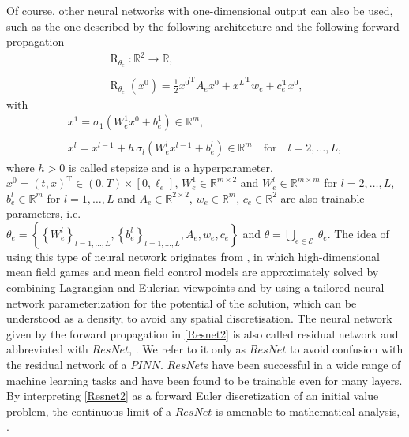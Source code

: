 Of course, other neural networks with one-dimensional output can also be used, such as the one described by the following architecture and the following forward propagation 
\begin{equation} 
    \label{Resnet1}
    \begin{gathered}
        \operatorname{R}_{\theta_e} \colon \mathbb{R}^2 \to \mathbb{R}, \\
        \\
        \operatorname{R}_{\theta_e}\left(x^0\right) = \frac{1}{2} {x^0}^{\mathrm{T}} A_e x^0 + {x^{L}}^{\mathrm{T}} w_e + c^{\mathrm{T}}_e x^0,
    \end{gathered} 
\end{equation} 
with
\begin{equation}
    \label{Resnet2} 
    \begin{gathered}
        x^1 = \sigma_1\left(W^1_e x^{0} + b^1_e\right) \in \mathbb{R}^m, \\
        \\
        x^l = x^{l-1} + h \, \sigma_l\left(W^l_e x^{l-1} + b^l_e\right) \in \mathbb{R}^m \quad \text{for} \quad l = 2, \ldots, L, 
    \end{gathered} 
\end{equation} 
where $h > 0$ is called stepsize and is a hyperparameter, $x^0 = \left(t, x\right)^{\mathrm{T}} \in \left(0, T\right) \times \left[0, \ell_e\right]$, $W^1_e \in \mathbb{R}^{m \times 2}$ and $W^l_e \in \mathbb{R}^{m \times m}$ for $l = 2, \ldots, L$, $b^l_e \in \mathbb{R}^{m}$ for $l = 1, \ldots, L$ and $A_e \in \mathbb{R}^{2 \times 2}$, $w_e \in \mathbb{R}^m$, $c_e \in \mathbb{R}^2$ are also trainable parameters, i.e. \\
$\theta_e = \left\{ \left\{ W^l_e \right\}_{l = 1, \ldots, L}, \left\{ b^l_e \right\}_{l = 1, \ldots, L}, A_e, w_e, c_e \right\}$ and $\theta = \bigcup_{e \in \mathcal{E}} \ \theta_e$. The idea of using this type of neural network originates from \cite{RuthottoOsherLiNurbekyanFung2020}, in which high-dimensional mean field games and mean field control models are approximately solved by combining Lagrangian and Eulerian viewpoints and by using a tailored neural network parameterization for the potential of the solution, which can be understood as a density, to avoid any spatial discretisation. The neural network given by the forward propagation in \cref{Resnet2} is also called residual network and abbreviated with $ResNet$, \cite{HeZhangRenSun:2015}. We refer to it only as $ResNet$ to avoid confusion with the residual network of a $PINN$. $ResNet$s have been successful in a wide range of machine learning tasks and have been found to be trainable even for many layers. By interpreting \cref{Resnet2} as a forward Euler discretization of an initial value problem, the continuous limit of a $ResNet$ is amenable to mathematical analysis, \cite[p.~6]{RuthottoOsherLiNurbekyanFung2020}. \\

